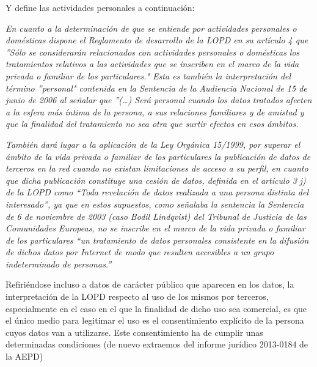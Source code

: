 \leftskip=0pt 
\rightskip=0pt

\noindent Y define las actividades personales a continuación:

\leftskip=1cm
\rightskip=1cm
{\em En cuanto a la determinación de que se entiende por actividades
personales o domésticas dispone el Reglamento de desarrollo de la LOPD en
su artículo 4 que ''Sólo se considerarán relacionados con actividades
personales o domésticas los tratamientos relativos a las actividades que se
inscriben en el marco de la vida privada o familiar de los particulares."
Esta es también la interpretación del término ''personal" contenida en la
Sentencia de la Audiencia Nacional de 15 de junio de 2006 al señalar que ''(…)
Será personal cuando los datos tratados afecten a la esfera más íntima de la
persona, a sus relaciones familiares y de amistad y que la finalidad del
tratamiento no sea otra que surtir efectos en esos ámbitos.}

\leftskip=1cm
\rightskip=1cm
{\em También dará lugar a la aplicación de la Ley Orgánica 15/1999, por
superar el ámbito de la vida privada o familiar de los particulares la publicación
de datos de terceros en la red cuando no existan limitaciones de acceso a su
perfil, en cuanto que dicha publicación constituye una cesión de datos, definida
en el artículo 3 j) de la LOPD como “Toda revelación de datos realizada a una
persona distinta del interesado”, ya que en estos supuestos, como señalaba la
sentencia la Sentencia de 6 de noviembre de 2003 (caso Bodil Lindqvist) del
Tribunal de Justicia de las Comunidades Europeas, no se inscribe en el marco
de la vida privada o familiar de los particulares “un tratamiento de datos
personales consistente en la difusión de dichos datos por Internet de modo que
resulten accesibles a un grupo indeterminado de personas.”}

\leftskip=0pt
\rightskip=0pt




Refiriéndose incluso a datos de carácter público que aparecen en los datos,
la interpretación de la LOPD respecto al uso de los mismos por terceros, especialmente
en el caso en el que la finalidad de dicho uso sea comercial, es que el único medio
para legitimar el uso es el consentimiento explícito de la persona cuyos datos van 
a utilizarse. Este consentimiento ha de cumplir unas determinadas condiciones
(de nuevo extraemos del informe jurídico  2013-0184 de la AEPD)

